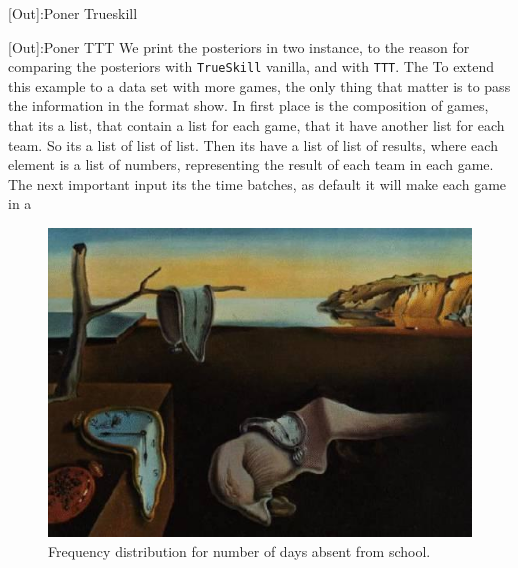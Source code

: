 \documentclass[article]{jss}
\begin{document}

\vspace{-0.3cm}
[Out]:Poner Trueskill

[Out]:Poner TTT
\vspace{0.3cm}
We print the posteriors in two instance, to the reason for comparing the posteriors with \texttt{TrueSkill} vanilla, and with \texttt{TTT}.
The 
To extend this example to a data set with more games, the only thing that matter is to pass the information in the format show. 
In first place is the composition of games, that its a list, that contain a list for each game, that it have another list for each team. 
So its a list of list of list. 
Then its have a list of list of results, where each element is a list of numbers, representing the result of each team in each game. 
The next important input its the time batches, as default it will make each game in a 


















\begin{figure}[h!]
\centering
\includegraphics{jsslogo}
\caption{\label{fig:quine} Frequency distribution for number of days absent
from school.}
\end{figure}
\end{document}
